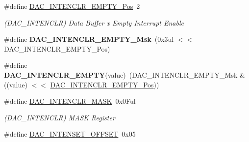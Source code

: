 \begin{DoxyCompactItemize}
\item 
\hypertarget{group___s_a_m_l21___d_a_c_gae91b3684292cdb9164d07f4b2de13b80}{}\#define \hyperlink{group___s_a_m_l21___d_a_c_gae91b3684292cdb9164d07f4b2de13b80}{D\+A\+C\+\_\+\+I\+N\+T\+E\+N\+C\+L\+R\+\_\+\+E\+M\+P\+T\+Y\+\_\+\+Pos}~2\label{group___s_a_m_l21___d_a_c_gae91b3684292cdb9164d07f4b2de13b80}

\begin{DoxyCompactList}\small\item\em (D\+A\+C\+\_\+\+I\+N\+T\+E\+N\+C\+L\+R) Data Buffer x Empty Interrupt Enable \end{DoxyCompactList}\item 
\hypertarget{group___s_a_m_l21___d_a_c_ga7d29d3d94228c876c77fd92dc33b2f98}{}\#define {\bfseries D\+A\+C\+\_\+\+I\+N\+T\+E\+N\+C\+L\+R\+\_\+\+E\+M\+P\+T\+Y\+\_\+\+Msk}~(0x3ul $<$$<$ D\+A\+C\+\_\+\+I\+N\+T\+E\+N\+C\+L\+R\+\_\+\+E\+M\+P\+T\+Y\+\_\+\+Pos)\label{group___s_a_m_l21___d_a_c_ga7d29d3d94228c876c77fd92dc33b2f98}

\item 
\hypertarget{group___s_a_m_l21___d_a_c_ga43c1412f1ed316bb5aedc21cf25372d9}{}\#define {\bfseries D\+A\+C\+\_\+\+I\+N\+T\+E\+N\+C\+L\+R\+\_\+\+E\+M\+P\+T\+Y}(value)~(D\+A\+C\+\_\+\+I\+N\+T\+E\+N\+C\+L\+R\+\_\+\+E\+M\+P\+T\+Y\+\_\+\+Msk \& ((value) $<$$<$ \hyperlink{group___s_a_m_l21___d_a_c_gae91b3684292cdb9164d07f4b2de13b80}{D\+A\+C\+\_\+\+I\+N\+T\+E\+N\+C\+L\+R\+\_\+\+E\+M\+P\+T\+Y\+\_\+\+Pos}))\label{group___s_a_m_l21___d_a_c_ga43c1412f1ed316bb5aedc21cf25372d9}

\item 
\hypertarget{group___s_a_m_l21___d_a_c_ga85bb6a4ca23cf5a609ff966cfe6ac6eb}{}\#define \hyperlink{group___s_a_m_l21___d_a_c_ga85bb6a4ca23cf5a609ff966cfe6ac6eb}{D\+A\+C\+\_\+\+I\+N\+T\+E\+N\+C\+L\+R\+\_\+\+M\+A\+S\+K}~0x0\+Ful\label{group___s_a_m_l21___d_a_c_ga85bb6a4ca23cf5a609ff966cfe6ac6eb}

\begin{DoxyCompactList}\small\item\em (D\+A\+C\+\_\+\+I\+N\+T\+E\+N\+C\+L\+R) M\+A\+S\+K Register \end{DoxyCompactList}\item 
\hypertarget{group___s_a_m_l21___d_a_c_ga0ccf063ca605c99a4d7675883da90a35}{}\#define \hyperlink{group___s_a_m_l21___d_a_c_ga0ccf063ca605c99a4d7675883da90a35}{D\+A\+C\+\_\+\+I\+N\+T\+E\+N\+S\+E\+T\+\_\+\+O\+F\+F\+S\+E\+T}~0x05\label{group___s_a_m_l21___d_a_c_ga0ccf063ca605c99a4d7675883da90a35}


\end{DoxyCompactItemize}
